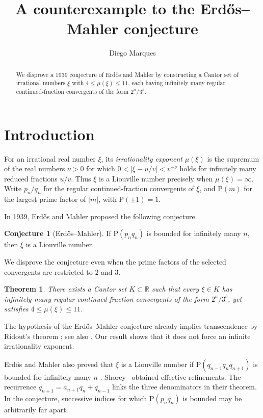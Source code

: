 \documentclass[11pt,reqno]{amsart}
\title{A counterexample to the Erd\H{o}s--Mahler conjecture}
\author[D. Marques]{Diego Marques}
\newtheorem*{theorem}{Theorem}
\theoremstyle{definition}
\newtheorem*{conjecture}{Conjecture}
\theoremstyle{plain}
\theoremstyle{definition}
\theoremstyle{remark}
\newcommand{\PP}{\mathrm P}
\begin{document}
\begin{abstract}
We disprove a 1939 conjecture of Erd\H{o}s and Mahler by
constructing a Cantor set of irrational numbers $\xi$ with
$4\le\mu(\xi)\le11$, each having infinitely many regular
continued-fraction convergents of the form $2^a/3^b$.
\end{abstract}

\maketitle


\section{Introduction}\label{sec:intro}


For an irrational real number $\xi$, its \emph{irrationality
exponent} $\mu(\xi)$ is the supremum of the real numbers
$\nu>0$ for which $0<|\xi-u/v|<v^{-\nu}$ holds for
infinitely many reduced fractions $u/v$. Thus $\xi$ is a
Liouville number precisely when $\mu(\xi)=\infty$.
Write $p_n/q_n$ for the regular continued-fraction
convergents of $\xi$, and $\PP(m)$ for the largest
prime factor of $|m|$, with $\PP(\pm1)=1$.

In 1939, Erd\H{o}s and Mahler \cite[p.~18]{EM}
proposed the following conjecture.

\begin{conjecture}[Erd\H{o}s--Mahler]
If $\PP(p_nq_n)$ is bounded for infinitely many $n$,
then $\xi$ is a Liouville number.
\end{conjecture}

We disprove the conjecture even when the prime factors
of the selected convergents are restricted to $2$ and $3$.

\begin{theorem}\label{thm:main}
There exists a Cantor set $K\subset\mathbb R$ such that
every $\xi\in K$ has infinitely many regular
continued-fraction convergents of the form $2^a/3^b$,
yet satisfies $4\le\mu(\xi)\le11$.
\end{theorem}

The hypothesis of the Erd\H{o}s--Mahler conjecture already
implies transcendence by Ridout's theorem \cite{Ridout};
see also \cite[Theorem~2.3, p.~29]{Bugeaud}.
Our result shows that it does not force an infinite
irrationality exponent.

Erd\H{o}s and Mahler also proved that $\xi$ is a Liouville number
if $\PP(q_{n-1}q_nq_{n+1})$ is bounded for infinitely many $n$
\cite[Theorem~2, p.~17]{EM}. Shorey~\cite{Shorey} obtained effective
refinements. The recurrence $q_{n+1}=a_{n+1}q_n+q_{n-1}$ links the
three denominators in their theorem. In the conjecture, successive
indices for which $\PP(p_nq_n)$ is bounded may be arbitrarily far apart.
\end{document}
